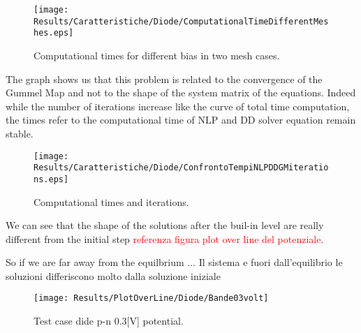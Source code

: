 \begin{figure}[!h]
\centering
\texttt{[image: Results/Caratteristiche/Diode/ComputationalTimeDifferentMeshes.eps]}
\caption{Computational times for different bias in two mesh cases.}
\label{fig: tempi computazionali}
\end{figure}

The graph  shows us that this problem is related to the convergence of the Gummel Map and not to the shape of the system matrix of the equations. Indeed while the number of iterations increase like the curve of total time computation, the times refer to the computational time of NLP and DD solver equation remain stable.

\begin{figure}[!h]
\centering
\texttt{[image: Results/Caratteristiche/Diode/ConfrontoTempiNLPDDGMiterations.eps]}
\caption{Computational times and iterations.}
\label{fig: times and iterations}
\end{figure}



We can see that the shape of the solutions after the buil-in level are really different from the initial step \textcolor{red}{referenza figura plot over line del potenziale}.

\begin{figure}[!h]
\centering
{}
\hspace{1cm}
\end{figure}

So if we are far away from the equilbrium ...
Il sistema e fuori dall'equilibrio le soluzioni differiscono molto dalla soluzione iniziale


\begin{figure}[!h]
\centering
\texttt{[image: Results/PlotOverLine/Diode/Bande03volt]}
\end{figure}


\clearpage 

\begin{figure}[!h]
\centering
{}
\hspace{0.5cm}
\hspace{0.5cm}
\caption{Test case dide p-n 0.3[V] potential.}
\label{fig: diode potential}
\end{figure}

